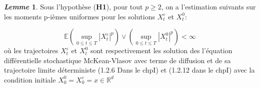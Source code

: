 \documentclass[12pt,a4paper,twoside,fleqn]{book}%
\theoremstyle{definition}
\theoremstyle{lemme}
\newtheorem{lem}[dfn]{\textit{Lemme}}
\numberwithin{equation}{section}
\begin{document}
\begin{lem}
	Sous l'hypothèse (\textbf{H1}), pour tout $p\geq2$, on a l'estimation suivants sur les moments p-ièmes uniformes pour les solutions $X_t^\varepsilon$ et $X_t^0$:
	
	\begin{equation}\label{eq:2.2.15}
		\mathbb{E}\left(\sup_{0\leq t\leq T}|X_t^\varepsilon|^p  \right)\vee\left(\sup_{0\leq t \leq T}|X_t^0|^p\right)<\infty
	\end{equation}
	où les trajectoires $X_t^\varepsilon$ et $X_t^0$ sont respectivement les solution des l'équation différentielle stochastique McKean-Vlasov avec terme de diffusion et de sa trajectoire limite déterministe (1.2.6 Dans le chpI) et (1.2.12 dans le chpI) 
avec la condition initiale $X_0^0=X_0^\varepsilon=x\in\mathbb{R}^d$	
\end{lem}
\end{document}
